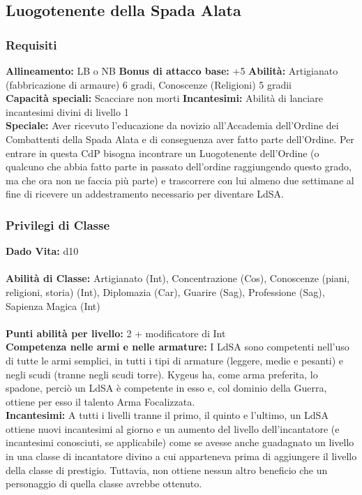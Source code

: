 \documentclass[a4paper]{report}
\begin{document}
\begin{multicols}{2}

\section{Luogotenente della Spada Alata}

\subsubsection*{Requisiti}
\textbf{Allineamento:} LB o NB
\textbf{Bonus di attacco base:} +5
\textbf{Abilità:} Artigianato (fabbricazione di armaure) 6 gradi, Conoscenze (Religioni) 5 gradii\\
\textbf{Capacità speciali:} Scacciare non morti
\textbf{Incantesimi:} Abilità di lanciare incantesimi divini di livello 1\\
\textbf{Speciale:} Aver ricevuto l’educazione da novizio all’Accademia dell’Ordine dei Combattenti della Spada Alata e di conseguenza aver fatto parte dell’Ordine. Per entrare in questa CdP bisogna incontrare un Luogotenente dell’Ordine (o qualcuno che abbia fatto parte in passato dell’ordine raggiungendo questo grado, ma che ora non ne faccia più parte) e trascorrere con lui almeno due settimane al fine di ricevere un addestramento necessario per diventare LdSA.\\
\subsubsection*{Privilegi di Classe}
\textbf{Dado Vita:} d10\\
\\
\textbf{Abilità di Classe:} Artigianato (Int), Concentrazione (Cos), Conoscenze (piani, religioni, storia) (Int), Diplomazia (Car), Guarire (Sag), Professione (Sag), Sapienza Magica (Int)\\
\\
\textbf{Punti abilità per livello:} 2 + modificatore di Int\\

\textbf{Competenza nelle armi e nelle armature:} I LdSA sono competenti nell’uso di tutte le armi semplici, in tutti i tipi di armature (leggere, medie e pesanti) e negli scudi (tranne negli scudi torre). Kygeus ha, come arma preferita, lo spadone, perciò un LdSA è competente in esso e, col dominio della Guerra, ottiene per esso il talento Arma Focalizzata.\\

\textbf{Incantesimi:} A tutti i livelli tranne il primo, il quinto e l’ultimo, un LdSA ottiene nuovi incantesimi al giorno e un aumento del livello dell'incantatore (e incantesimi conosciuti, se applicabile) come se avesse anche guadagnato un livello in una classe di incantatore divino a cui apparteneva prima di aggiungere il livello della classe di prestigio. Tuttavia, non ottiene nessun altro beneficio che un personaggio di quella classe avrebbe ottenuto. 


\end{multicols}
\end{document}

